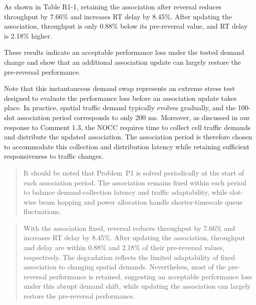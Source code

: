 \documentclass[11pt,a4paper]{article}
\begin{document}
As shown in Table R1-1, retaining the association after reversal reduces throughput by 7.66\% and increases RT delay by 8.45\%. After updating the association, throughput is only 0.88\% below its pre-reversal value, and RT delay is 2.18\% higher.
\par

These results indicate an acceptable performance loss under the tested demand change and show that an additional association update can largely restore the pre-reversal performance.
\par

Note that this instantaneous demand swap represents an extreme stress test designed to evaluate the performance loss before an association update takes place. In practice, spatial traffic demand typically evolves gradually, and the 100-slot association period corresponds to only 200 ms. Moreover, as discussed in our response to Comment 1.3, the NOCC requires time to collect cell traffic demands and distribute the updated association. The association period is therefore chosen to accommodate this collection and distribution latency while retaining sufficient responsiveness to traffic changes.
\par


\begin{quote}\small\color{revisionblue}
It should be noted that Problem~P1 is solved periodically at the start of each association period. The association remains fixed within each period to balance demand-collection latency and traffic adaptability, while slot-wise beam hopping and power allocation handle shorter-timescale queue fluctuations.
\par
\end{quote}


\begin{quote}\small\color{revisionblue}
With the association fixed, reversal reduces throughput by 7.66\% and increases RT delay by 8.45\%. After updating the association, throughput and delay are within 0.88\% and 2.18\% of their pre-reversal values, respectively. The degradation reflects the limited adaptability of fixed association to changing spatial demands. Nevertheless, most of the pre-reversal performance is retained, suggesting an acceptable performance loss under this abrupt demand shift, while updating the association can largely restore the pre-reversal performance.
\par
\end{quote}
\end{document}

